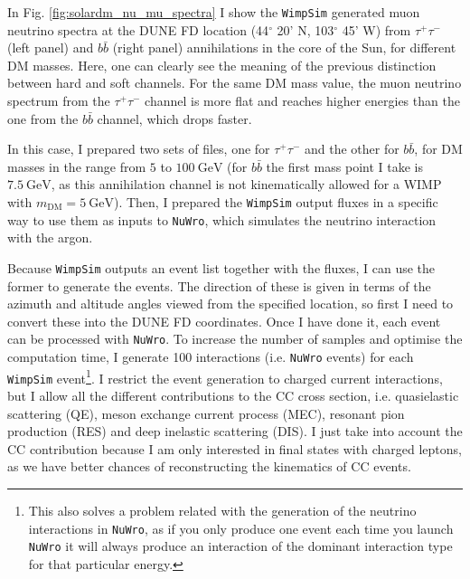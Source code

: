 In Fig. \ref{fig:solardm_nu_mu_spectra} I show the \texttt{WimpSim} \cite{Blennow2007, WimpSim} generated muon neutrino spectra at the DUNE FD location (44$^{\circ} $ 20' N, 103$^{\circ} $ 45' W) from $\tau^{+} \tau^{-}$ (left panel) and $b\bar{b}$ (right panel) annihilations in the core of the Sun, for different DM masses. Here, one can clearly see the meaning of the previous distinction between hard and soft channels. For the same DM mass value, the muon neutrino spectrum from the $\tau^{+} \tau^{-}$ channel is more flat and reaches higher energies than the one from the $b\bar{b}$ channel, which drops faster.

In this case, I prepared two sets of files, one for $\tau^{+} \tau^{-}$ and the other for $b\bar{b}$, for DM masses in the range from $5$ to $100 \ \mathrm{GeV}$ (for $b\bar{b}$ the first mass point I take is $7.5 \ \mathrm{GeV}$, as this annihilation channel is not kinematically allowed for a WIMP with $m_{\mathrm{DM}}=5 \ \mathrm{GeV}$). Then, I prepared the \texttt{WimpSim} output fluxes in a specific way to use them as inputs to \texttt{NuWro}, which simulates the neutrino interaction with the argon.

Because \texttt{WimpSim} outputs an event list together with the fluxes, I can use the former to generate the events. The direction of these is given in terms of the azimuth and altitude angles viewed from the specified location, so first I need to convert these into the DUNE FD coordinates. Once I have done it, each event can be processed with \texttt{NuWro}. To increase the number of samples and optimise the computation time, I generate 100 interactions (i.e. \texttt{NuWro} events) for each \texttt{WimpSim} event\footnote{This also solves a problem related with the generation of the neutrino interactions in \texttt{NuWro}, as if you only produce one event each time you launch \texttt{NuWro} it will always produce an interaction of the dominant interaction type for that particular energy.}. I restrict the event generation to charged current interactions, but I allow all the different contributions to the CC cross section, i.e. quasielastic scattering (QE), meson exchange current process (MEC), resonant pion production (RES) and deep inelastic scattering (DIS). I just take into account the CC contribution because I am only interested in final states with charged leptons, as we have better chances of reconstructing the kinematics of CC events.

